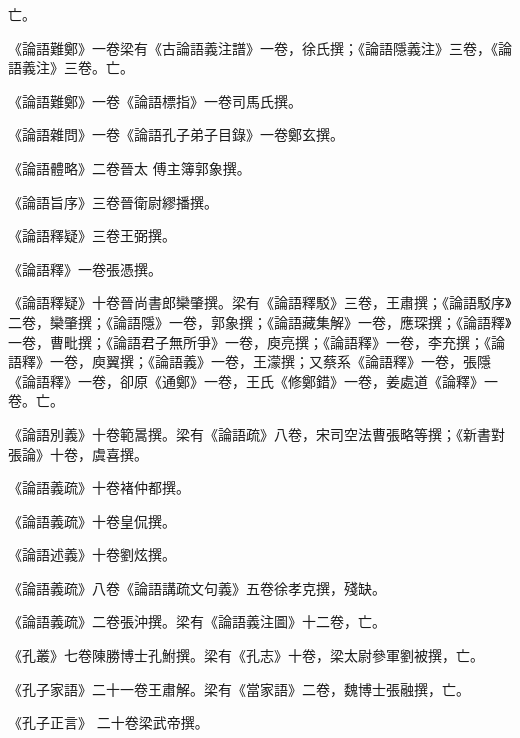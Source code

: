 \begin{pinyinscope}
 亡。



 《論語難鄭》一卷梁有《古論語義注譜》一卷，徐氏撰；《論語隱義注》三卷，《論語義注》三卷。亡。



 《論語難鄭》一卷《論語標指》一卷司馬氏撰。



 《論語雜問》一卷《論語孔子弟子目錄》一卷鄭玄撰。



 《論語體略》二卷晉太
 傅主簿郭象撰。



 《論語旨序》三卷晉衛尉繆播撰。



 《論語釋疑》三卷王弼撰。



 《論語釋》一卷張憑撰。



 《論語釋疑》十卷晉尚書郎欒肇撰。梁有《論語釋駁》三卷，王肅撰；《論語駁序》二卷，欒肇撰；《論語隱》一卷，郭象撰；《論語藏集解》一卷，應琛撰；《論語釋》一卷，曹毗撰；《論語君子無所爭》一卷，庾亮撰；《論語釋》一卷，李充撰；《論語釋》一卷，庾翼撰；《論語義》一卷，王濛撰；又蔡系《論語釋》一卷，張隱《論語釋》一卷，卻原《通鄭》一卷，王氏《修鄭錯》一卷，姜處道《論釋》一卷。亡。



 《論語別義》十卷範暠撰。梁有《論語疏》八卷，宋司空法曹張略等撰；《新書對張論》十卷，虞喜撰。



 《論語義疏》十卷褚仲都撰。



 《論語義疏》十卷皇侃撰。



 《論語述義》十卷劉炫撰。



 《論語義疏》八卷《論語講疏文句義》五卷徐孝克撰，殘缺。



 《論語義疏》二卷張沖撰。梁有《論語義注圖》十二卷，亡。



 《孔叢》七卷陳勝博士孔鮒撰。梁有《孔志》十卷，梁太尉參軍劉被撰，亡。



 《孔子家語》二十一卷王肅解。梁有《當家語》二卷，魏博士張融撰，亡。



 《孔子正言》
 二十卷梁武帝撰。




\end{pinyinscope}
